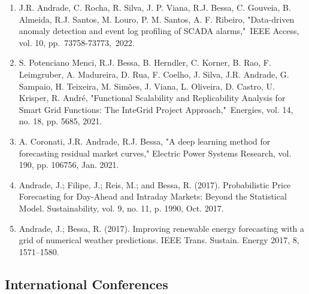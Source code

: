 \documentclass{mycv}
\begin{document}
\begin{enumerate}
	
	\item J.R. Andrade, C. Rocha, R. Silva, J. P. Viana, R.J. Bessa, C. Gouveia, B. Almeida, R.J. Santos, M. Louro, P. M. Santos, A. F. Ribeiro, "Data-driven anomaly detection and event log profiling of SCADA alarms," IEEE Access, vol. 10, pp. 73758-73773, 2022.
	
	\item S. Potenciano Menci, R.J. Bessa, B. Herndler, C. Korner, B. Rao, F. Leimgruber, A. Madureira, D. Rua, F. Coelho, J. Silva, J.R. Andrade, G. Sampaio, H. Teixeira, M. Simões, J. Viana, L. Oliveira, D. Castro, U. Krisper, R. André, "Functional Scalability and Replicability Analysis for Smart Grid Functions: The InteGrid Project Approach," Energies,  vol. 14, no. 18, pp. 5685, 2021.
	
	\item A. Coronati, J.R. Andrade, R.J. Bessa, "A deep learning method for forecasting residual market curves," Electric Power Systems Research, vol. 190, pp. 106756, Jan. 2021.
	
	\item Andrade, J.; Filipe, J.; Reis, M.; and Bessa, R. (2017). Probabilistic Price Forecasting for Day-Ahead and Intraday Markets: Beyond the Statistical Model. Sustainability, vol. 9, no. 11, p. 1990, Oct. 2017.
	
	\item Andrade, J.; Bessa, R. (2017). Improving renewable energy forecasting with a grid of
	numerical weather predictions. IEEE Trans. Sustain. Energy 2017, 8, 1571–1580.
	
	
\end{enumerate}


\subsection{International Conferences}
\end{document}
